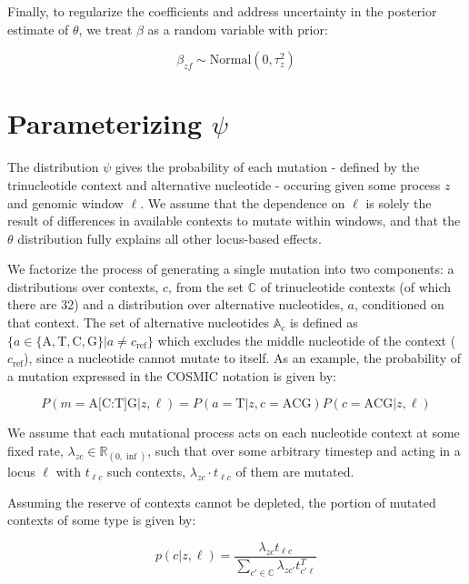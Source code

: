 \documentclass{article}
\begin{document}
Finally, to regularize the coefficients and address uncertainty in the posterior estimate of $\theta$, we treat $\beta$ as a random variable with prior:

\begin{equation}
\beta_{zf} \sim \textrm{Normal}(0,\tau^2_z)
\end{equation}


\section{Parameterizing $\psi$}

The distribution $\psi$ gives the probability of each mutation - defined by the trinucleotide context and alternative nucleotide - occuring given some process $z$ and genomic window $\ell$. We assume that the dependence on $\ell$ is solely the result of differences in available contexts to mutate within windows, and that the $\theta$ distribution fully explains all other locus-based effects.

We factorize the process of generating a single mutation into two components: a distributions over contexts, $c$, from the set $\mathbb{C}$ of trinucleotide contexts (of which there are 32) and a distribution over alternative nucleotides, $a$, conditioned on that context. The set of alternative nucleotides $\mathbb{A}_c$ is defined as $\{ a \in \{\mathrm{A, T, C, G}\} | a \neq c_{\mathrm{ref}}\}$ which excludes the middle nucleotide of the context ($c_{\mathrm{ref}}$), since a nucleotide cannot mutate to itself. As an example, the probability of a mutation expressed in the COSMIC notation is given by:

\begin{equation}
P(m = \textrm{A[C:T]G} | z, \ell) = P(a=\textrm{T} | z, c=\textrm{ACG}) P(c=\textrm{ACG} | z, \ell)
\end{equation}

We assume that each mutational process acts on each nucleotide context at some fixed rate, $\lambda_{zc} \in \mathbb{R}_{(0,\inf)}$, such that over some arbitrary timestep and acting in a locus $\ell$ with $ t_{\ell c}$ such contexts, $\lambda_{zc}\cdot t_{\ell c}$ of them are mutated.

Assuming the reserve of contexts cannot be depleted, the portion of mutated contexts of some type is given by:

\begin{equation}
p(c | z, \ell) = \frac{\lambda_{zc}t_{\ell c}}{\sum_{c'\in \mathbb{C}} \lambda_{zc'}t^{T}_{c' \ell}} 
\end{equation}
\end{document}
